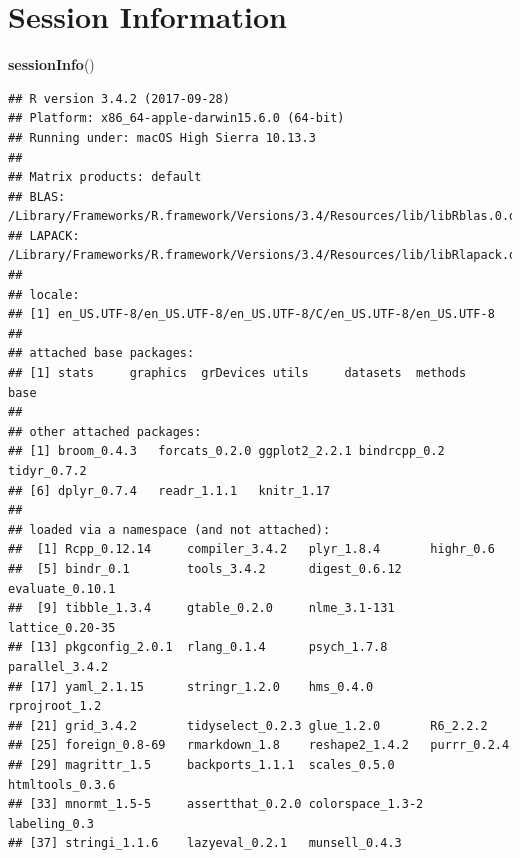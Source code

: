 \documentclass[]{article}
\newenvironment{Shaded}{\begin{snugshade}}{\end{snugshade}}
\newcommand{\KeywordTok}[1]{\textcolor[rgb]{0.13,0.29,0.53}{\textbf{#1}}}
\newcommand{\NormalTok}[1]{#1}
\begin{document}
\section{Session Information}\label{session-information}

\begin{Shaded}
\begin{Highlighting}[]
\KeywordTok{sessionInfo}\NormalTok{()}
\end{Highlighting}
\end{Shaded}

\begin{verbatim}
## R version 3.4.2 (2017-09-28)
## Platform: x86_64-apple-darwin15.6.0 (64-bit)
## Running under: macOS High Sierra 10.13.3
## 
## Matrix products: default
## BLAS: /Library/Frameworks/R.framework/Versions/3.4/Resources/lib/libRblas.0.dylib
## LAPACK: /Library/Frameworks/R.framework/Versions/3.4/Resources/lib/libRlapack.dylib
## 
## locale:
## [1] en_US.UTF-8/en_US.UTF-8/en_US.UTF-8/C/en_US.UTF-8/en_US.UTF-8
## 
## attached base packages:
## [1] stats     graphics  grDevices utils     datasets  methods   base     
## 
## other attached packages:
## [1] broom_0.4.3   forcats_0.2.0 ggplot2_2.2.1 bindrcpp_0.2  tidyr_0.7.2  
## [6] dplyr_0.7.4   readr_1.1.1   knitr_1.17   
## 
## loaded via a namespace (and not attached):
##  [1] Rcpp_0.12.14     compiler_3.4.2   plyr_1.8.4       highr_0.6       
##  [5] bindr_0.1        tools_3.4.2      digest_0.6.12    evaluate_0.10.1 
##  [9] tibble_1.3.4     gtable_0.2.0     nlme_3.1-131     lattice_0.20-35 
## [13] pkgconfig_2.0.1  rlang_0.1.4      psych_1.7.8      parallel_3.4.2  
## [17] yaml_2.1.15      stringr_1.2.0    hms_0.4.0        rprojroot_1.2   
## [21] grid_3.4.2       tidyselect_0.2.3 glue_1.2.0       R6_2.2.2        
## [25] foreign_0.8-69   rmarkdown_1.8    reshape2_1.4.2   purrr_0.2.4     
## [29] magrittr_1.5     backports_1.1.1  scales_0.5.0     htmltools_0.3.6 
## [33] mnormt_1.5-5     assertthat_0.2.0 colorspace_1.3-2 labeling_0.3    
## [37] stringi_1.1.6    lazyeval_0.2.1   munsell_0.4.3
\end{verbatim}
\end{document}
